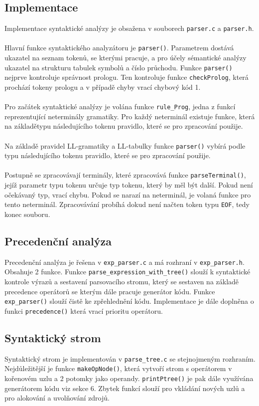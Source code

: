 \documentclass[11pt,a4paper]{article}
\begin{document}
\subsection{Implementace}
Implementace syntaktické analýzy je obsažena v souborech \verb|parser.c| a \verb|parser.h|.
\\ \\
Hlavní funkce syntaktického analyzátoru je \verb|parser()|. Parametrem dostává ukazatel na seznam tokenů,
se kterými pracuje, a pro účely sémantické analýzy ukazatel na strukturu tabulek symbolů a číslo průchodu.
Funkce \verb|parser()| nejprve kontroluje správnost prologu. Ten kontroluje funkce \verb|checkProlog|, která
prochází tokeny prologu a v případě chyby vrací chybový kód 1. \\\\
Pro začátek syntaktické analýzy je volána funkce \verb|rule_Prog|, jedna z funkcí reprezentující neterminály gramatiky.
Pro každý neterminál existuje funkce, která na základětypu následujícího tokenu pravidlo, které se pro zpracování použije.\\\\
Na základě pravidel LL-gramatiky a LL-tabulky funkce \verb|parser()| vybírá podle typu následujícího tokenu pravidlo,
které se pro zpracování použije.\\\\
Postupně se zpracovávají terminály, které zpracovává funkce \verb|parseTerminal()|, jejíž parametr typu tokenu určuje typ tokenu,
který by měl být další. Pokud není očekávaný typ, vrací chybu. Pokud se narazí na neterminál, je volaná funkce pro tento neterminál.
Zpracovávání probíhá dokud není načten token typu \verb|EOF|, tedy konec souboru.

\subsection{Precedenční analýza}
Precedenční analýza je řešena v \verb|exp_parser.c| a má rozhraní v \verb|exp_parser.h|. Obsahuje 2 funkce.
\newline Funkce \verb|parse_expression_with_tree()| slouží k syntaktické kontrole výrazů a sestavení parsovacího stromu, který se sestaven na základě precedence operátorů se kterým dále pracuje generátor kódu. Funkce \verb|exp_parser()| slouží čistě ke zpřehlednění kódu. Implementace je dále doplněna o funkci \verb|precedence()| která vrací prioritu operátoru.

\subsection{Syntaktický strom}
Syntaktický strom je implementován v \verb|parse_tree.c| se stejnojmeným rozhraním. Nejdůležitější je funkce \verb|makeOpNode()|, která vytvoří strom s operátorem v kořenovém uzlu a 2 potomky jako operandy. \verb|printPtree()| je pak dále využívána generátorem kódu viz sekce 6. Zbytek funkcí slouží pro vkládání nových uzlů a pro alokování a uvolňování zdrojů.
\end{document}
